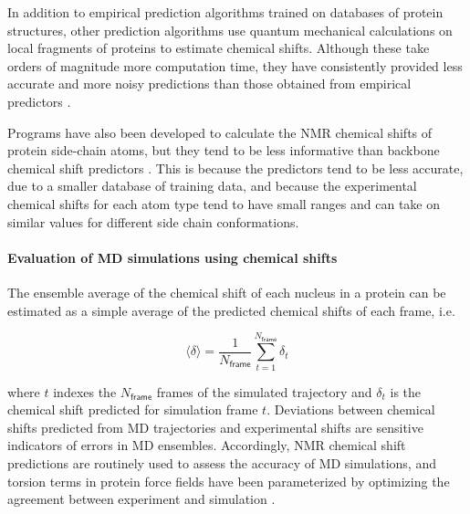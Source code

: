 \documentclass[9pt,review]{livecoms}
\begin{document}
In addition to empirical prediction algorithms trained on databases of protein structures, other prediction algorithms use quantum mechanical calculations on local fragments of proteins to estimate chemical shifts.
Although these take orders of magnitude more computation time, they have consistently provided less accurate and more noisy predictions than those obtained from empirical predictors \cite{mulder_nmr_2010,frank_toward_2012,sumowski_sensitivity_2014,fritz_determination_2018,case_using_2020,chandy_accurate_2020}.

Programs have also been developed to calculate the NMR chemical shifts of protein side-chain atoms, but they tend to be less informative than backbone chemical shift predictors \cite{han_shiftx2_2011,sahakyan_structure-based_2011,sahakyan_using_2011,li_ppm_one_2015}.
This is because the predictors tend to be less accurate, due to a smaller database of training data, and because the experimental chemical shifts for each atom type tend to have small ranges and can take on similar values for different side chain conformations.

\paragraph{Evaluation of MD simulations using chemical shifts}

The ensemble average of the chemical shift of each nucleus in a protein can be estimated as a simple average of the predicted chemical shifts of each frame, i.e. 

\begin{equation}
\label{eqn:shift_estimate}
\langle \delta \rangle = \frac {1} {N_\mathsf{frame}} \sum_{t=1}^{N_{\mathsf{frame}}} \delta_t
\end{equation}

\noindent where $t$ indexes the $N_{\mathsf{frame}}$ frames of the simulated trajectory and $\delta_t$ is the chemical shift predicted for simulation frame $t$.
Deviations between chemical shifts predicted from MD trajectories and experimental shifts are sensitive indicators of errors in MD ensembles.
Accordingly, NMR chemical shift predictions are routinely used to assess the accuracy of MD simulations, and torsion terms in protein force fields have been parameterized by optimizing the agreement between experiment and simulation \cite{li_nmr-based_2010,robustelli_developing_2018}.
\end{document}
